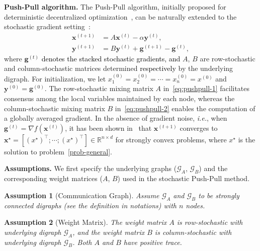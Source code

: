 \documentclass[10pt]{article}
\newtheorem{assumption}{Assumption}
\newcommand{\vg}{{\mathbf{g}}}
\newcommand{\vx}{{\mathbf{x}}}
\newcommand{\vy}{{\mathbf{y}}}
\newcommand{\cG}{{\mathcal{G}}}
\newcommand{\pushpull}{{\sc Push-Pull}\xspace}
\newcommand{\ie}{{\em i.e.\xspace}}
\newcommand{\revision}[1]{\textcolor{black}{#1}}
\begin{document}
\vspace{0.5mm}
\textbf{Push-Pull algorithm.} The \pushpull algorithm, initially proposed for deterministic decentralized optimization~\cite{pu2020push,xin2018linear}, can be naturally extended to the stochastic gradient setting~\cite{xin2019SAB}:
\begin{subequations}
\label{eq:wenads}
\begin{align}
    \vx^{(t+1)}&=A\vx^{(t)}-\alpha \vy^{(t)}\label{eq:pushpull-1},\\
\vy^{(t+1)}&=B\vy^{(t)}+\vg^{(t+1)}-\vg^{(t)},\label{eq:pushpull-2}
\end{align}
\end{subequations}
where \revision{$\vg^{(t)}$ denotes the stacked stochastic gradients, and} $A$, $B$ are row-stochastic and column-stochastic matrices determined \revision{respectively} by the underlying digraph. For initialization, we let  $x_1^{(0)}=x_2^{(0)}=\cdots=x_n^{(0)}=x^{(0)}$ and $\vy^{(0)}=\vg^{(0)}$. The row-stochastic mixing matrix \( A \) in~\eqref{eq:pushpull-1} facilitates consensus among the local variables maintained by each node, whereas the column-stochastic mixing matrix \( B \) in~\eqref{eq:pushpull-2} enables the computation of a globally averaged gradient. In the absence of gradient noise, \ie, when 
\( \vg^{(t)} = \nabla f(\vx^{(t)})
\),
it has been shown in~\cite{pu2020push,xin2018linear} that \( \vx^{(t+1)} \) converges to 
\( \vx^\star = [(x^\star)^\top;\cdots;(x^\star)^\top] \in \mathbb{R}^{n \times d} \) for strongly convex problems, where \( x^\star \) is the solution to problem~\eqref{prob-general}.

\vspace{0.5mm}
\textbf{Assumptions.} 
We first specify the underlying graphs (\(\mathcal{G}_A\), \(\mathcal{G}_B\)) and the corresponding weight matrices (\(A\), \(B\)) used in the stochastic \pushpull method.
\begin{assumption}[\sc \small Communication Graph]\label{ass:graph}
     Assume $\cG_A$ and $\cG_B$ to be strongly connected digraphs (see the definition in notations) with $n$ nodes.
\end{assumption}

\begin{assumption}[\sc \small Weight Matrix]\label{ass:matrix}
    The weight matrix \(A\) is row-stochastic with underlying digraph \(\mathcal{G}_A\), and the weight matrix \(B\) is column-stochastic with underlying digraph \(\mathcal{G}_B\). Both \(A\) and \(B\) have positive trace.
\end{assumption}
\end{document}
